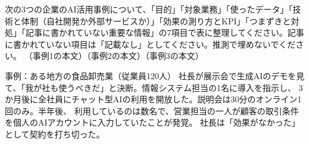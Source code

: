 
\begin{promptbox}[事例の要約と比較]
次の3つの企業のAI活用事例について、「目的」「対象業務」「使ったデータ」「技術と体制（自社開発か外部サービスか）」「効果の測り方とKPI」「つまずきと対処」「記事に書かれていない重要な情報」の7項目で表に整理してください。記事に書かれていない項目は「記載なし」としてください。推測で埋めないでください。
（事例1の本文）（事例2の本文）（事例3の本文）
\end{promptbox}

\begin{point}{事例：ある地方の食品卸売業（従業員120人）}
社長が展示会で生成AIのデモを見て、「我が社も使うべきだ」と決断。情報システム担当の1名に導入を指示し、
3か月後に全社員にチャット型AIの利用を開放した。説明会は30分のオンライン1回のみ。半年後、
利用しているのは数名で、営業担当の一人が顧客の取引条件を個人のAIアカウントに入力していたことが発覚。
社長は「効果がなかった」として契約を打ち切った。
\end{point}



